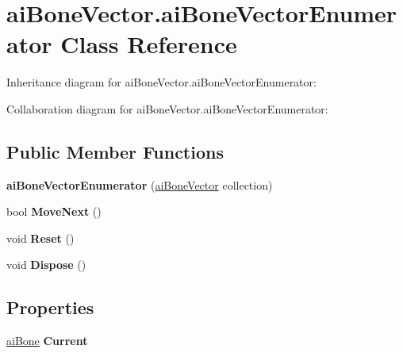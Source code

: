 \hypertarget{classai_bone_vector_1_1ai_bone_vector_enumerator}{\section{ai\+Bone\+Vector.\+ai\+Bone\+Vector\+Enumerator Class Reference}
\label{classai_bone_vector_1_1ai_bone_vector_enumerator}
}


Inheritance diagram for ai\+Bone\+Vector.\+ai\+Bone\+Vector\+Enumerator\+:


Collaboration diagram for ai\+Bone\+Vector.\+ai\+Bone\+Vector\+Enumerator\+:
\subsection*{Public Member Functions}
\begin{DoxyCompactItemize}
\item 
\hypertarget{classai_bone_vector_1_1ai_bone_vector_enumerator_aebe16ab61c71958a6d567ee237846d9d}{{\bfseries ai\+Bone\+Vector\+Enumerator} (\hyperlink{classai_bone_vector}{ai\+Bone\+Vector} collection)}\label{classai_bone_vector_1_1ai_bone_vector_enumerator_aebe16ab61c71958a6d567ee237846d9d}

\item 
\hypertarget{classai_bone_vector_1_1ai_bone_vector_enumerator_aab07d1b57c19cf670eefe6662c82e912}{bool {\bfseries Move\+Next} ()}\label{classai_bone_vector_1_1ai_bone_vector_enumerator_aab07d1b57c19cf670eefe6662c82e912}

\item 
\hypertarget{classai_bone_vector_1_1ai_bone_vector_enumerator_a2b011d8a7794f7f0ee2389e8b2681a1a}{void {\bfseries Reset} ()}\label{classai_bone_vector_1_1ai_bone_vector_enumerator_a2b011d8a7794f7f0ee2389e8b2681a1a}

\item 
\hypertarget{classai_bone_vector_1_1ai_bone_vector_enumerator_af44791de8fffeb46970445e30b38f721}{void {\bfseries Dispose} ()}\label{classai_bone_vector_1_1ai_bone_vector_enumerator_af44791de8fffeb46970445e30b38f721}

\end{DoxyCompactItemize}
\subsection*{Properties}
\begin{DoxyCompactItemize}
\item 
\hypertarget{classai_bone_vector_1_1ai_bone_vector_enumerator_a3064ac8461c54d26b40f868551d11098}{\hyperlink{structai_bone}{ai\+Bone} {\bfseries Current}}\label{classai_bone_vector_1_1ai_bone_vector_enumerator_a3064ac8461c54d26b40f868551d11098}

\end{DoxyCompactItemize}


